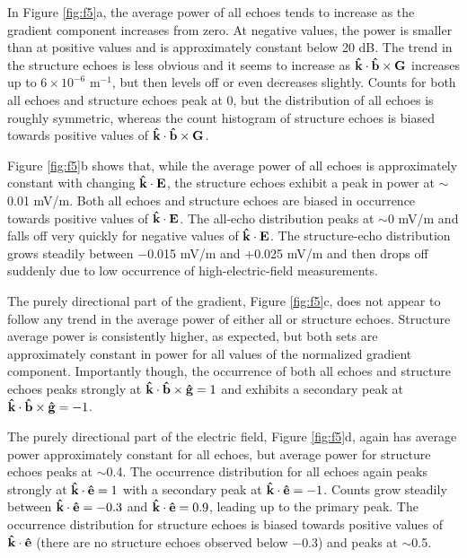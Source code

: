 In Figure \ref{fig:f5}a, the average power of all echoes tends to increase as the gradient component increases from zero. At negative values, the power is smaller than at positive values and is approximately constant below 20 dB. The trend in the structure echoes is less obvious and it seems to increase as  \(\mathbf{\hat{k}}\cdot\mathbf{\hat{b}}\times\mathbf{G}\) increases up to \(6\times10^{-6}\) m\(^{-1}\), but then levels off or even decreases slightly.  Counts for both all echoes and structure echoes peak at 0, but the distribution of all echoes is roughly symmetric, whereas the count histogram of structure echoes is biased towards positive values of  \(\mathbf{\hat{k}}\cdot\mathbf{\hat{b}}\times\mathbf{G}\).

Figure \ref{fig:f5}b shows that, while the average power of all echoes is approximately constant with changing \(\mathbf{\hat{k}}\cdot\mathbf{E}\), the structure echoes exhibit a peak in power at \(\sim\)0.01 mV/m.
Both all echoes and structure echoes are biased in occurrence towards positive values of \(\mathbf{\hat{k}}\cdot\mathbf{E}\). The all-echo distribution peaks at \(\sim\)0 mV/m and falls off very quickly for negative values of \(\mathbf{\hat{k}}\cdot\mathbf{E}\). The structure-echo distribution grows steadily between $-$0.015 mV/m and $+$0.025 mV/m and then drops off suddenly due to low occurrence of high-electric-field measurements.

The purely directional part of the gradient, Figure \ref{fig:f5}c, does not appear to follow any trend in the average power of either all or structure echoes.  Structure average power is consistently higher, as expected, but both sets are approximately constant in power for all values of the normalized gradient component.  Importantly though, the occurrence of both all echoes and structure echoes peaks strongly at \(\mathbf{\hat{k}}\cdot\mathbf{\hat{b}}\times\mathbf{\hat{g}} = 1\) and exhibits a secondary peak at \(\mathbf{\hat{k}}\cdot\mathbf{\hat{b}}\times\mathbf{\hat{g}} = -1\).

The purely directional part of the electric field, Figure \ref{fig:f5}d, again has average power approximately constant for all echoes, but average power for structure echoes peaks at \(\sim\)0.4.  The occurrence distribution for all echoes again peaks strongly at \(\mathbf{\hat{k}}\cdot\mathbf{\hat{e}} = 1\) with a secondary peak at \(\mathbf{\hat{k}}\cdot\mathbf{\hat{e}} = -1\). Counts grow steadily between \(\mathbf{\hat{k}}\cdot\mathbf{\hat{e}} = -0.3\) and \(\mathbf{\hat{k}}\cdot\mathbf{\hat{e}} = 0.9\), leading up to the primary peak.  The occurrence distribution for structure echoes is biased towards positive values of \(\mathbf{\hat{k}}\cdot\mathbf{\hat{e}}\) (there are no structure echoes observed below $-$0.3) and peaks at \(\sim\)0.5.

